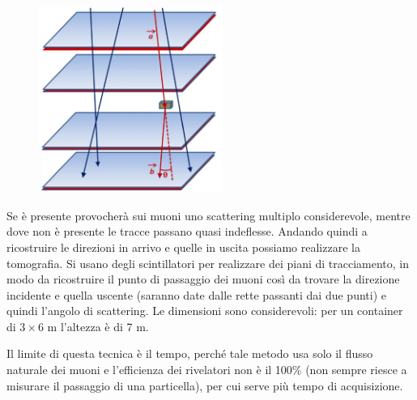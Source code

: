 \begin{minipage}{0.395\textwidth}
    \begin{figure}[H]
        \centering
        \includegraphics[width=6cm]{immagini/tomografia_muonica.png}
    \end{figure}
\end{minipage}
\begin{minipage}{0.6\textwidth}
    \vspace{0.5cm}Se è presente provocherà sui muoni uno scattering multiplo considerevole, mentre dove non è presente le tracce passano quasi indeflesse. Andando quindi a ricostruire le direzioni in arrivo e quelle in uscita possiamo realizzare la tomografia. Si usano degli scintillatori per realizzare dei piani di tracciamento, in modo da ricostruire il punto di passaggio dei muoni così da trovare la direzione incidente e quella uscente (saranno date dalle rette passanti dai due punti) e quindi l'angolo di scattering. Le dimensioni sono considerevoli: per un container di $3 \times 6$ m l'altezza è di 7 m.
\end{minipage}

\vspace{0.4cm}Il limite di questa tecnica è il tempo, perché tale metodo usa solo il flusso naturale dei muoni e l'efficienza dei rivelatori non è il 100\% (non sempre riesce a misurare il passaggio di una particella), per cui serve più tempo di acquisizione.